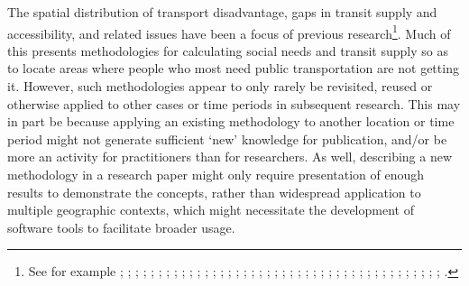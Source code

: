 \documentclass[preprint, 3p,
authoryear]{elsarticle} %
\begin{document}
The spatial distribution of transport disadvantage, gaps in transit
supply and accessibility, and related issues have been a focus of
previous research\footnote{See for example \citet{Ricciardi2015}
  \citet{Currie2003Hobart}; \citet{currie2010identifying};
  \citet{Fransen2015Identifying}; \citet{Guzman2017Assessing};
  \citet{Jaramillo2012}; \citet{Preston2007};
  \citet{Delbosc2011Transportproblems}; \citet{Delbosc2011Thespatial};
  \citet{Engels2011Social}; \citet{Pavkova2016};
  \citet{Delbosc2011Using}; \citet{Murray2001};
  \citet{Currie2010Modeling}; \citet{Currie2007Investigating};
  \citet{Currie2007Identifying}; \citet{Yigitcanlar2007};
  \citet{Wu2003}; \citet{Currie2013Exploring};
  \citet{Preston2007Accessibility}; \citet{Hurni2005};
  \citet{Mamun2011}; \citet{El_geneidy2016}; \citet{Kaplan2014};
  \citet{Martens2012}; \citet{Lucas2016AMethod};
  \citet{Liu2012Accessibility}; \citet{Lucas2012Transport_and_social};
  \citet{Lei2010Mapping}; \citet{Mavoa2012GIS};
  \citet{Delmelle2012Evaluating}; \citet{Foth2014Toward};
  \citet{Welch2013Equity}; \citet{Bell2007Travel};
  \citet{Jaramillob2011Urban}; \citet{Guzman2017Assessing};
  \citet{Wee2011Discussing}; \citet{Currie2004Gap};
  \citet{Engels2011Social}; \citet{Litman2002Evaluation};
  \citet{Parolin2017Identifying}; \citet{Xia2016AMulti};
  \citet{Welch2013AMeasure}; \citet{Jang2017Assessing}.}. Much of this
presents methodologies for calculating social needs and transit supply
so as to locate areas where people who most need public transportation
are not getting it. However, such methodologies appear to only rarely be
revisited, reused or otherwise applied to other cases or time periods in
subsequent research. This may in part be because applying an existing
methodology to another location or time period might not generate
sufficient `new' knowledge for publication, and/or be more an activity
for practitioners than for researchers. As well, describing a new
methodology in a research paper might only require presentation of
enough results to demonstrate the concepts, rather than widespread
application to multiple geographic contexts, which might necessitate the
development of software tools to facilitate broader usage.
\end{document}
